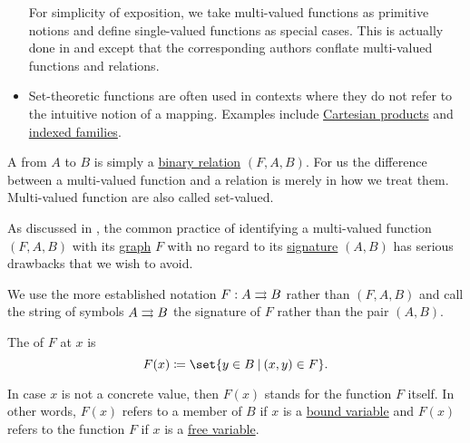\begin{remark}
\begin{itemize}
    For simplicity of exposition, we take multi-valued functions as primitive notions and define single-valued functions as special cases. This is actually done in \cite[def. 2.31]{OpenLogicFull} and \cite[8]{Kelley1955} except that the corresponding authors conflate multi-valued functions and relations.

    \item Set-theoretic functions are often used in contexts where they do not refer to the intuitive notion of a mapping. Examples include \hyperref[def:cartesian_product]{Cartesian products} and \hyperref[def:cartesian_product/indexed_family]{indexed families}.
  \end{itemize}
\end{remark}

\begin{definition}\label{def:multi_valued_function}
  A  from \( A \) to \( B \) is simply a \hyperref[def:binary_relation]{binary relation} \( (F, A, B) \). For us the difference between a multi-valued function and a relation is merely in how we treat them. Multi-valued function are also called set-valued.

  As discussed in , the common practice of identifying a multi-valued function \( (F, A, B) \) with its \hyperref[def:relation/graph]{graph} \( F \) with no regard to its \hyperref[def:relation/signature]{signature} \( (A, B) \) has serious drawbacks that we wish to avoid.

  We use the more established notation \( F: A \rightrightarrows B \) rather than \( (F, A, B) \) and call the string of symbols \( A \rightrightarrows B \) the signature of \( F \) rather than the pair \( (A, B) \).

  \begin{thmenum}[series=def:multi_valued_function]
     The  of \( F \) at \( x \) is
    \begin{equation*}
      F(x) \coloneqq \set{ y \in B \given (x, y) \in F }.
    \end{equation*}

    In case \( x \) is not a concrete value, then \( F(x) \) stands for the function \( F \) itself. In other words, \( F(x) \) refers to a member of \( B \) if \( x \) is a \hyperref[def:first_order_syntax/formula_bound_variables]{bound variable} and \( F(x) \) refers to the function \( F \) if \( x \) is a \hyperref[def:first_order_syntax/formula_free_variables]{free variable}.


\end{thmenum}
\end{definition}
